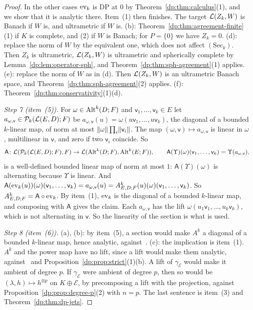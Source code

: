 \begin{proof}
In the other cases $\operatorname{ev}_k$ is DP at $0$ by Theorem~\ref{dp:thm:calculus}(1), and we show that it is analytic there. Item~(1) then finishes. The target $\mathcal L(Z_k,W)$ is Banach if $W$ is, and ultrametric if $W$ is. (b): Theorem~\ref{dp:thm:agreement-finite}(1) if $K$ is complete, and (2) if $W$ is Banach; for $P=\{0\}$ we have $Z_k=0$. (d): replace the norm of $W$ by the equivalent one, which does not affect $(\mathrm{Sec}_k)$. Then $Z_k$ is ultrametric, $\mathcal L(Z_k,W)$ is ultrametric and spherically complete by Lemma~\ref{dp:lem:operator-sph}, and Theorem~\ref{dp:thm:sph-agreement}(1) applies. (e): replace the norm of $W$ as in (d). Then $\mathcal L(Z_k,W)$ is an ultrametric Banach space, and Theorem~\ref{dp:thm:sph-agreement}(2) applies. (f): Theorem~\ref{dp:thm:conservativity}(1)(d).

\emph{Step 7 (item~(5)).} For $\omega\in\operatorname{Alt}^k(D;F)$ and $\mathsf v_1,\dots,\mathsf v_k\in E$ let $a_{\omega,\mathsf v}\in\mathcal P_k(\mathcal L(E,D);F)$ be $a_{\omega,\mathsf v}(u)=\omega(u\mathsf v_1,\dots,u\mathsf v_k)$, the diagonal of a bounded $k$-linear map, of norm at most $\lVert \omega\rVert\prod_i\lVert \mathsf v_i\rVert$. The map $(\omega,\mathsf v)\mapsto a_{\omega,\mathsf v}$ is linear in $\omega$, multilinear in $\mathsf v$, and zero if two $\mathsf v_i$ coincide. So
\[
 \mathsf A\colon\mathcal L(\mathcal P_k(\mathcal L(E,D);F),F)\to\mathcal L(\operatorname{Alt}^k(D;F),\operatorname{Alt}^k(E;F)),\qquad\mathsf A(\Upsilon)(\omega)(\mathsf v_1,\dots,\mathsf v_k)=\Upsilon(a_{\omega,\mathsf v}),
\]
is a well-defined bounded linear map of norm at most $1$: $\mathsf A(\Upsilon)(\omega)$ is alternating because $\Upsilon$ is linear. And $\mathsf A(\operatorname{ev}_k(u))(\omega)(\mathsf v_1,\dots,\mathsf v_k)=a_{\omega,\mathsf v}(u)=A^k_{E,D;F}(u)(\omega)(\mathsf v_1,\dots,\mathsf v_k)$. So $A^k_{E,D;F}=\mathsf A\circ\operatorname{ev}_k$. By item~(1), $\operatorname{ev}_k$ is the diagonal of a bounded $k$-linear map, and composing with $\mathsf A$ gives the claim. Each $a_{\omega,\mathsf v}$ has the lift $\omega(u_1\mathsf v_1,\dots,u_k\mathsf v_k)$, which is not alternating in $\mathsf v$. So the linearity of the section is what is used.

\emph{Step 8 (item~(6)).} (a), (b): by item~(5), a section would make $A^k$ a diagonal of a bounded $k$-linear map, hence analytic, against~\cite[Theorem~7.2]{I}. (c): the implication is item~(1). $A^k$ and the power map have no lift, since a lift would make them analytic, against~\cite[Theorem~7.2]{I} and Proposition~\ref{dp:prop:strict}(1)(b). A lift of $\gamma_{\mathcal E}$ would make it ambient of degree $p$. If $\gamma_{\mathcal E}$ were ambient of degree $p$, then so would be $(\lambda,h)\mapsto h^{\otimes p}$ on $K\oplus\mathcal E$, by precomposing a lift with the projection, against Proposition~\ref{dp:prop:degree-p}(2) with $n=p$. The last sentence is item~(3) and Theorem~\ref{dp:thm:dp-jets}.
\end{proof}

